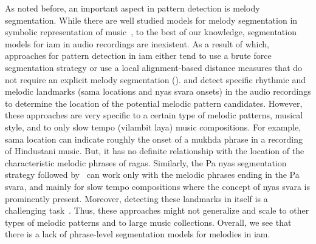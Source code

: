 As noted before, an important aspect in pattern detection is melody segmentation. While there are well studied models for melody segmentation in symbolic representation of music~\citep{Cambouropoulos2006,rodriguez2014comparing,bozkurt2014usul}, to the best of our knowledge, segmentation models for \gls{iam} in audio recordings are inexistent. As a result of which, approaches for pattern detection in \gls{iam} either tend to use a brute force segmentation strategy or use a local alignment-based distance measures that do not require an explicit melody segmentation (). \cite{Ross2012} and \cite{Ross2012b} detect specific rhythmic and melodic landmarks (\gls{sama} locations and \gls{nyas} \gls{svara} onsets) in the audio recordings to determine the location of the potential melodic pattern candidates. However, these approaches are very specific to a certain type of melodic patterns, musical style, and to only slow tempo (vilambit \gls{laya}) music compositions. For example, \gls{sama} location can indicate roughly the onset of a \gls{mukhda} phrase in a recording of Hindustani music. But, it has no definite relationship with the location of the characteristic melodic phrases of \glspl{raga}. Similarly, the Pa \gls{nyas} segmentation strategy followed by~\cite{Ross2012} can work only with the melodic phrases ending in the Pa \gls{svara}, and mainly for slow tempo compositions where the concept of \gls{nyas} \gls{svara} is prominently present. Moreover, detecting these landmarks in itself is a challenging task~\citep{srinivasamurthy2014supervised,gulati2014Landmark}. Thus, these approaches might not generalize and scale to other types of melodic patterns and to large music collections. Overall, we see that there is a lack of phrase-level segmentation models for melodies in \gls{iam}.

